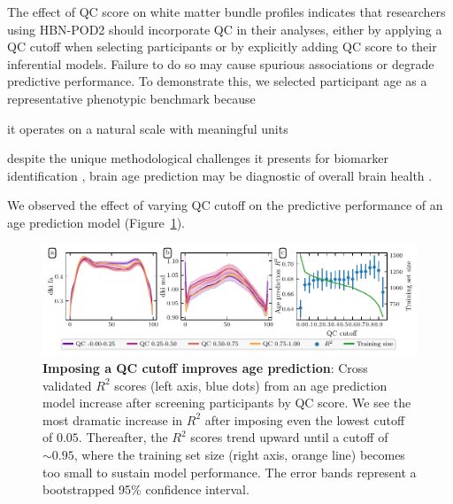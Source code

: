 \documentclass[fleqn,10pt,inline]{wlscirep}
\begin{document}
The effect of QC score on white matter bundle profiles indicates that researchers
using HBN-POD2 should incorporate QC in their analyses, either by applying a QC cutoff
when selecting participants or by explicitly adding QC score to their inferential
models. Failure to do so may cause spurious associations or degrade predictive
performance. To demonstrate this, we selected participant age as a representative phenotypic benchmark because
\begin{enumerate*}[%
    label=(\roman*),%
    before=\unskip{ },%
    itemjoin={{, }},%
    itemjoin*={{ and }}]
    \item it operates on a natural scale with meaningful units
    \item despite the unique methodological challenges it presents for biomarker identification \cite{nelson2020biomarkers}, brain age prediction may be diagnostic of overall brain health \cite{franke2010estimating, cole2019brain, richie-halford2021multidimensional}.
\end{enumerate*}
We observed the effect of varying QC cutoff on the predictive performance of an age
prediction model (Figure~\ref{fig:age-prediction}).

\begin{figure}[tbp]
    \centering
    \includegraphics[width=\linewidth]{age-prediction/qc_sweep.pdf}
    \caption{%
        {\bf Imposing a QC cutoff improves age prediction}:
        Cross validated $R^2$ scores (left axis, blue dots) from an age
        prediction model increase after screening participants by QC score. We see
        the most dramatic increase in $R^2$ after imposing even the lowest
        cutoff of $0.05$. Thereafter, the $R^2$ scores trend upward until a
        cutoff of $\sim 0.95$, where the training set size (right axis, orange
        line) becomes too small to sustain model performance. The error bands
        represent a bootstrapped 95\% confidence interval.
    }
    \label{fig:age-prediction}
\end{figure}
\end{document}
